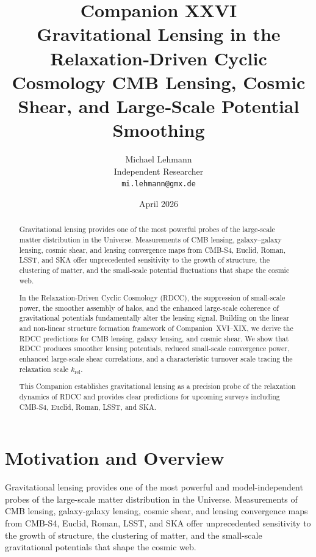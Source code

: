 \documentclass[11pt,a4paper]{article}
\title{
\textbf{Companion XXVI}\\[4mm]
\textbf{Gravitational Lensing in the Relaxation‑Driven Cyclic Cosmology  
CMB Lensing, Cosmic Shear, and Large‑Scale Potential Smoothing}}
\author{
Michael Lehmann\\
Independent Researcher\\
\texttt{mi.lehmann@gmx.de}
}
\date{April 2026}
\begin{document}
\maketitle

\begin{abstract}
Gravitational lensing provides one of the most powerful probes of the large-scale matter 
distribution in the Universe. Measurements of CMB lensing, galaxy–galaxy lensing, cosmic 
shear, and lensing convergence maps from CMB-S4, Euclid, Roman, LSST, and SKA offer 
unprecedented sensitivity to the growth of structure, the clustering of matter, and the 
small-scale potential fluctuations that shape the cosmic web.

In the Relaxation-Driven Cyclic Cosmology (RDCC), the suppression of small-scale power, the 
smoother assembly of halos, and the enhanced large-scale coherence of gravitational 
potentials fundamentally alter the lensing signal. Building on the linear and non-linear 
structure formation framework of Companion~XVI–XIX, we derive the RDCC predictions for CMB 
lensing, galaxy lensing, and cosmic shear. We show that RDCC produces smoother lensing 
potentials, reduced small-scale convergence power, enhanced large-scale shear correlations, 
and a characteristic turnover scale tracing the relaxation scale $k_{\mathrm{rel}}$.

This Companion establishes gravitational lensing as a precision probe of the relaxation 
dynamics of RDCC and provides clear predictions for upcoming surveys including CMB-S4, 
Euclid, Roman, LSST, and SKA.
\end{abstract}

\section{Motivation and Overview}

Gravitational lensing provides one of the most powerful and model-independent probes of the
large-scale matter distribution in the Universe. Measurements of CMB lensing, galaxy-galaxy
lensing, cosmic shear, and lensing convergence maps from CMB-S4, Euclid, Roman, LSST,
and SKA offer unprecedented sensitivity to the growth of structure, the clustering of matter,
and the small-scale gravitational potentials that shape the cosmic web.
\end{document}
